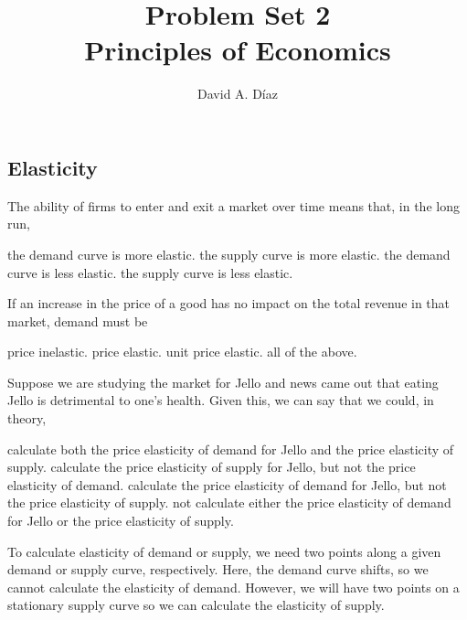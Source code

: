 \documentclass[addpoints,11pt]{exam}
\theoremstyle{definition}
\newcommand{\dd}[1]{}
\begin{document}
	
	
	\title{\textbf{Problem Set 2 \dd{Answers and Selected Solutions}} \\ \vspace{2 mm} {\large Principles of Economics}}
	\author{David A. D\'iaz}
	\date{}
	\maketitle


\subsection*{Elasticity}

\begin{questions}

	\question The ability of firms to enter and exit a market over time means that, in the long run,
	
	\begin{choices}
		\choice the demand curve is more elastic.
		\CorrectChoice the supply curve is more elastic.
		\choice the demand curve is less elastic.
		\choice the supply curve is less elastic.
	\end{choices}

\question If an increase in the price of a good has no impact on the total revenue in that market, demand must be

\begin{choices}
	\choice price inelastic.
	\choice price elastic.
	\CorrectChoice unit price elastic.
	\choice all of the above.
\end{choices}


	
	\question Suppose we are studying the market for Jello and news came out that eating Jello is detrimental to one's health.  Given this, we can say that we could, in theory, 
	
		\begin{choices}
			\choice calculate both the price elasticity of demand for Jello and the price elasticity of supply. 
			\CorrectChoice calculate the price elasticity of supply for Jello, but not the price elasticity of demand.
			\choice calculate the price elasticity of demand for Jello, but not the price elasticity of supply.
			\choice not calculate either the price elasticity of demand for Jello or the price elasticity of supply.
		\end{choices}
		
		\begin{solution}
			To calculate elasticity of demand or supply, we need two points along a given demand or supply curve, respectively. Here, the demand curve shifts, so we cannot calculate the elasticity of demand. However, we will have two points on a stationary supply curve so we can calculate the elasticity of supply.
		\end{solution}
	


\end{questions}
\end{document}
